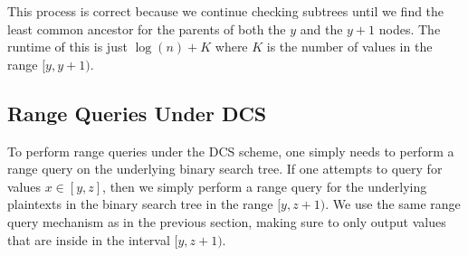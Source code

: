 \documentclass[12pt]{article}
\begin{document}
This process is correct because we continue checking subtrees until we find the least common ancestor for the parents of both the $y$ and the $y+1$ nodes. The runtime of this is just $\log(n) + K$ where $K$ is the number of values in the range $[y, y+1)$.
\subsection{Range Queries Under DCS}
 To perform range queries under the DCS scheme, one simply needs to perform a range query on the underlying binary search tree. If one attempts to query for values $x \in [y, z]$, then we simply perform a range query for the underlying plaintexts in the binary search tree in the range $[y, z+1)$. We use the same range query mechanism as in the previous section, making sure to only output values that are inside in the interval $[y, z+1)$.
\end{document}

